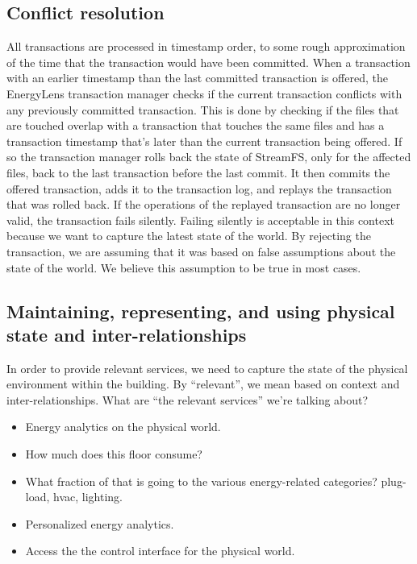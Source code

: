 \subsection{Conflict resolution}
All transactions are processed in timestamp order, to some rough approximation of the time that the transaction would have been committed.  When a transaction with an earlier timestamp than the last committed transaction is offered, the EnergyLens transaction manager checks if the current transaction conflicts with any previously committed transaction.  This is done by checking if the files that are touched overlap with a transaction that touches the same files and has a transaction timestamp that’s later than the current transaction being offered.  If so the transaction manager rolls back the state of StreamFS, only for the affected files, back to the last transaction before the last commit.  It then commits the offered transaction, adds it to the transaction log, and replays the transaction that was rolled back.  If the operations of the replayed transaction are no longer valid, the transaction fails silently.  Failing silently is acceptable in this context because we want to capture the latest state of the world.  By rejecting the transaction, we are assuming that it was based on false assumptions about the state of the world.  We believe this assumption to be true in most cases.


\subsection{Maintaining, representing, and using physical state and inter-relationships}
In order to provide relevant services, we need to capture the state of the physical environment within the building.  By “relevant”, we mean based on context and inter-relationships.  What are “the relevant services” we’re talking about?

\begin{itemize}
\item Energy analytics on the physical world.
\item How much does this floor consume?
\item What fraction of that is going to the various energy-related categories?  plug-load, hvac, lighting.
\item Personalized energy analytics.
\item Access the the control interface for the physical world.
\end{itemize}

